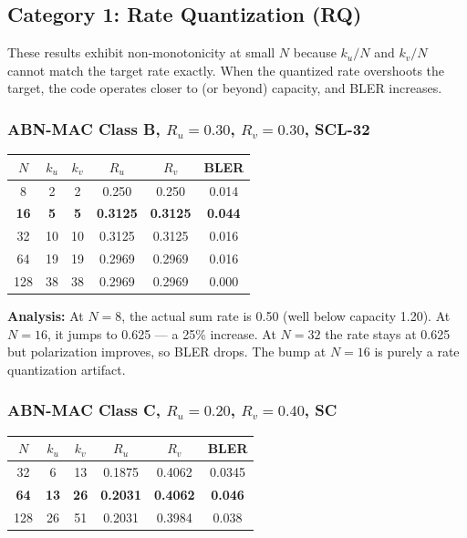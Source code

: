 \documentclass[11pt,a4paper]{article}
\newcommand{\up}[1]{\textcolor{upcolor}{\textbf{#1}}}
\begin{document}
\subsection{Category 1: Rate Quantization (RQ)}

These results exhibit non-monotonicity at small $N$ because $k_u/N$ and $k_v/N$ cannot match the target rate exactly. When the quantized rate overshoots the target, the code operates closer to (or beyond) capacity, and BLER increases.

\subsubsection{ABN-MAC Class B, $R_u=0.30$, $R_v=0.30$, SCL-32}

\begin{tabular}{cccccc}
\toprule
$N$ & $k_u$ & $k_v$ & $R_u$ & $R_v$ & BLER \\
\midrule
8 & 2 & 2 & 0.250 & 0.250 & 0.014 \\
\textbf{16} & \textbf{5} & \textbf{5} & \textbf{0.3125} & \textbf{0.3125} & \up{0.044} \\
32 & 10 & 10 & 0.3125 & 0.3125 & 0.016 \\
64 & 19 & 19 & 0.2969 & 0.2969 & 0.016 \\
128 & 38 & 38 & 0.2969 & 0.2969 & 0.000 \\
\bottomrule
\end{tabular}

\textbf{Analysis:} At $N=8$, the actual sum rate is 0.50 (well below capacity 1.20). At $N=16$, it jumps to 0.625 — a 25\% increase. At $N=32$ the rate stays at 0.625 but polarization improves, so BLER drops. The bump at $N=16$ is purely a rate quantization artifact.

\subsubsection{ABN-MAC Class C, $R_u=0.20$, $R_v=0.40$, SC}

\begin{tabular}{cccccc}
\toprule
$N$ & $k_u$ & $k_v$ & $R_u$ & $R_v$ & BLER \\
\midrule
32 & 6 & 13 & 0.1875 & 0.4062 & 0.0345 \\
\textbf{64} & \textbf{13} & \textbf{26} & \textbf{0.2031} & \textbf{0.4062} & \up{0.046} \\
128 & 26 & 51 & 0.2031 & 0.3984 & 0.038 \\
\bottomrule
\end{tabular}
\end{document}

